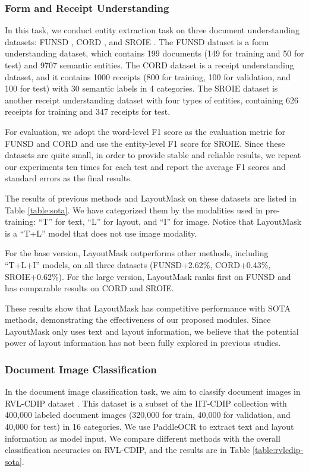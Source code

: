 \documentclass[11pt]{article}
\begin{document}
\subsubsection{Form and Receipt Understanding}


In this task, we conduct entity extraction task on three document understanding datasets: FUNSD \citep{jaume2019funsd}, CORD \citep{park2019cord}, and SROIE \citep{huang2019icdar2019}.
The FUNSD dataset is a form understanding dataset, which contains 199 documents (149 for training and 50 for test) and 9707 semantic entities.
The CORD dataset is a receipt understanding dataset, and it contains 1000 receipts (800 for training, 100 for validation, and 100 for test) with 30 semantic labels in 4 categories.
The SROIE dataset is another receipt understanding dataset with four types of entities, containing 626 receipts for training and 347 receipts for test.

For evaluation, we adopt the word-level F1 score as the evaluation metric for FUNSD and CORD and use the entity-level F1 score for SROIE.
Since these datasets are quite small, in order to provide stable and reliable results, we repeat our experiments ten times for each test and report the average F1 scores and standard errors as the final results.

The results of previous methods and LayoutMask on these datasets are listed in Table \ref{table:sota}.
We have categorized them by the modalities used in pre-training: ``T'' for text, ``L'' for layout, and ``I'' for image. 
Notice that LayoutMask is a ``T+L'' model that does not use image modality. 

For the base version, LayoutMask outperforms other methods, including ``T+L+I'' models, on all three datasets (FUNSD+2.62\%, CORD+0.43\%, SROIE+0.62\%).
For the large version, LayoutMask ranks first on FUNSD and has comparable results on CORD and SROIE.

These results show that LayoutMask has competitive performance with SOTA methods, demonstrating the effectiveness of our proposed modules.
Since LayoutMask only uses text and layout information, we believe that the potential power of layout information has not been fully explored in previous studies. 

\subsubsection{Document Image Classification}
In the document image classification task, we aim to classify document images in RVL-CDIP dataset \citep{rvl-cdip-harley2015evaluation}.
This dataset is a subset of the IIT-CDIP collection with 400,000 labeled document images (320,000 for train, 40,000 for validation, and 40,000 for test) in 16 categories. We use PaddleOCR to extract text and layout information as model input. 
We compare different methods with the overall classification accuracies on RVL-CDIP, and the results are in Table \ref{table:rvlcdip-sota}. 
\end{document}
